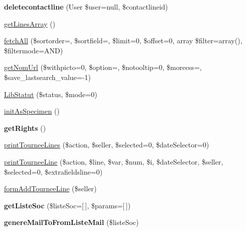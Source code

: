 \begin{DoxyCompactItemize}
{\bfseries deletecontactline} (User \$user=null, \$contactlineid)
\item 
\hyperlink{classTourneeGeneric_a10a64e1dda4704a4e06881b3c91a4d70}{get\+Lines\+Array} ()
\item 
\hyperlink{classTourneeGeneric_aad2a54dc58e21b6cb5b134700998778c}{fetch\+All} (\$sortorder=\textquotesingle{}\textquotesingle{}, \$sortfield=\textquotesingle{}\textquotesingle{}, \$limit=0, \$offset=0, array \$filter=array(), \$filtermode=\textquotesingle{}A\+ND\textquotesingle{})
\item 
\hyperlink{classTourneeGeneric_a384bb4a87b8c4ba69be3903e0e1997a7}{get\+Nom\+Url} (\$withpicto=0, \$option=\textquotesingle{}\textquotesingle{}, \$notooltip=0, \$morecss=\textquotesingle{}\textquotesingle{}, \$save\+\_\+lastsearch\+\_\+value=-\/1)
\item 
\hyperlink{classTourneeGeneric_a467dafa411ddc3d1832546590280e295}{Lib\+Statut} (\$status, \$mode=0)
\item 
\hyperlink{classTourneeGeneric_a134eebbb26416c1ed75176beb6288f5d}{init\+As\+Specimen} ()
\item 
\mbox{\label{classTourneeGeneric_af7f3eb439fe8a30e7d28069c140de262}} 
{\bfseries get\+Rights} ()
\item 
\hyperlink{classTourneeGeneric_acf58f9823680a80f041a90a23017c460}{print\+Tournee\+Lines} (\$action, \$seller, \$selected=0, \$date\+Selector=0)
\item 
\hyperlink{classTourneeGeneric_a1a07c23b1527eec5c606b63551f29446}{print\+Tournee\+Line} (\$action, \$line, \$var, \$num, \$i, \$date\+Selector, \$seller, \$selected=0, \$extrafieldsline=0)
\item 
\hyperlink{classTourneeGeneric_a9bc89936bc1d2c3e6c561075d4fff784}{form\+Add\+Tournee\+Line} (\$seller)
\item 
\mbox{\label{classTourneeGeneric_aa1a68282c8efd4030f945583bd06839d}} 
{\bfseries get\+Liste\+Soc} (\$liste\+Soc=\mbox{[}$\,$\mbox{]}, \$params=\mbox{[}$\,$\mbox{]})
\item 
\mbox{\label{classTourneeGeneric_a1955081803d88cdec54542ccab435945}} 
{\bfseries genere\+Mail\+To\+From\+Liste\+Mail} (\$liste\+Soc)
\item 
\mbox{\label{classTourneeGeneric_adde6879d00a1b58d3ba6983cbe198f8d}} 

\end{DoxyCompactItemize}
